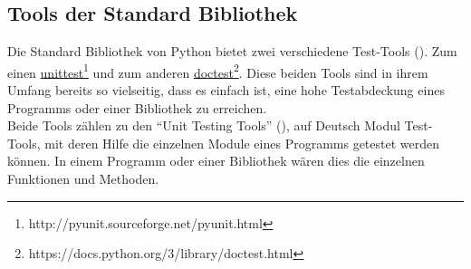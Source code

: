 \subsection{Tools der Standard Bibliothek}\label{python-tools:stdlib}

Die Standard Bibliothek von Python bietet zwei verschiedene Test-Tools (\cite{wiki.python:PythonTestingToolsTaxonomy}).
Zum einen
\href{http://pyunit.sourceforge.net/pyunit.html}{unittest}\footnote{http://pyunit.sourceforge.net/pyunit.html}
und zum anderen
\href{https://docs.python.org/3/library/doctest.html}{doctest}\footnote{https://docs.python.org/3/library/doctest.html}.
Diese beiden Tools sind in ihrem Umfang bereits so vielseitig, dass es einfach 
ist, eine hohe Testabdeckung eines Programms oder einer Bibliothek zu erreichen.
\newline
\\
Beide Tools zählen zu den "`Unit Testing Tools"' 
(\cite{wiki.python:PythonTestingToolsTaxonomy}),
auf Deutsch Modul Test-Tools, mit deren Hilfe die einzelnen Module eines Programms
getestet werden können. In einem Programm oder einer Bibliothek wären dies die einzelnen
Funktionen und Methoden.




